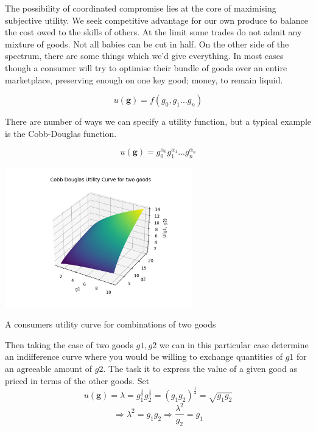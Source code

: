 \documentclass{tufte-handout}
\begin{document}
The possibility of coordinated compromise lies at the core of maximising subjective utility. We seek competitive advantage for our own produce to balance the cost owed to the skills of others. At the limit some trades do not admit any mixture of goods. Not all babies can be cut in half. On the other side of the spectrum, there are some things which we'd give everything. In most cases though a consumer will try to optimise their bundle of goods over an entire marketplace, preserving enough on one key good; money, to remain liquid. 

$$ u(\mathbf{g}) = f(g_{0}, g_{1} ... g_{n}) $$

There are number of ways we can specify a utility function, but a typical example is the Cobb-Douglas function. 

$$ u(\mathbf{g}) = g_{0}^{\alpha_{0}}g_{1}^{\alpha_{1}} ... g_{n}^{\alpha_{n}}$$

\begin{marginfigure}
\includegraphics[width=3.2in, height=5.in]{Plots/cobb_douglas_utility.png}
\caption{A consumers utility curve for combinations of two goods}
\end{marginfigure} 

Then taking the case of two goods $g1, g2$ we can in this particular case determine an indifference curve where you would be willing to exchange quantities of $g1$ for an agreeable amount of $g2$. The task it to express the value of a given good as priced in terms of the other goods. Set 
$$u(\mathbf{g}) = \lambda =  g_{1}^{\frac{1}{2}}g_{2}^{\frac{1}{2}} = (g_{1}g_{2})^{\frac{1}{2}}  = \sqrt{g_{1}g_{2}}$$
$$ \Rightarrow \lambda^{2} = g_{1}g_{2} \Rightarrow \frac{\lambda^{2}}{g_{2}} = g_{1}$$
\end{document}
